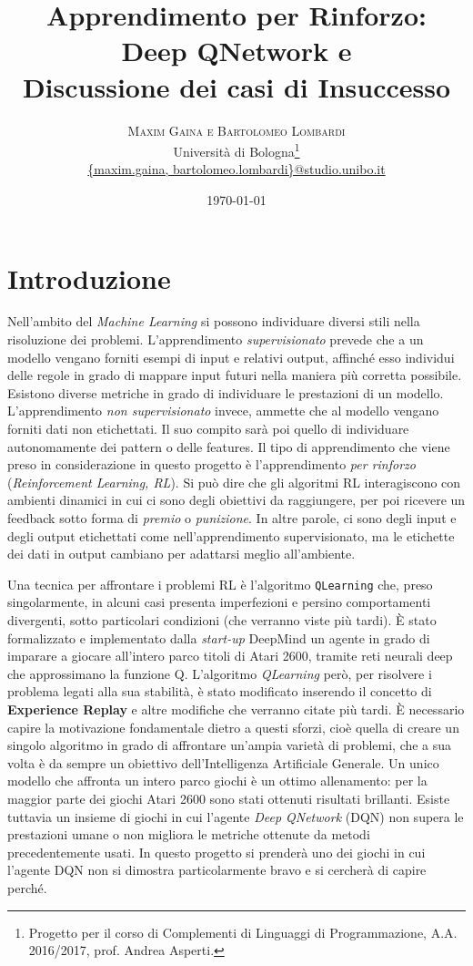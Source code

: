 \documentclass[twoside,twocolumn,10pt]{extarticle}
\title{Apprendimento per Rinforzo:\\Deep Q\texttwelveudash Network e\\ Discussione dei casi di Insuccesso} %
\author{%
\textsc{Maxim Gaina e Bartolomeo Lombardi} \\[1ex] %
\normalsize Università di Bologna\thanks{Progetto per il corso di Complementi di Linguaggi di Programmazione, A.A. 2016/2017, prof. Andrea Asperti.} \\ %
\normalsize \href{mailto:maxim.gaina@studio.unibo.it}{\{maxim.gaina, bartolomeo.lombardi\}@studio.unibo.it}
}
\date{\today} %
\theoremstyle{definition}
\begin{document}
\maketitle

\tableofcontents

\section*{Introduzione}
	\lettrine[nindent = 0.4em,lines=3]{N}\space\MakeTextLowercase{e}ll'ambito del \textit{Machine Learning} si possono individuare diversi stili nella risoluzione dei problemi. L'apprendimento \textit{supervisionato} prevede che a un modello vengano forniti esempi di input e relativi output, affinché esso individui delle regole in grado di mappare input futuri nella maniera più corretta possibile. Esistono diverse metriche in grado di individuare le prestazioni di un modello. L'apprendimento \textit{non supervisionato} invece, ammette che al modello vengano forniti dati non etichettati. Il suo compito sarà poi quello di individuare autonomamente dei pattern o delle features. Il tipo di apprendimento che viene preso in considerazione in questo progetto è l'apprendimento \textit{per rinforzo} (\textit{Reinforcement Learning, RL}). Si può dire che gli algoritmi RL interagiscono con ambienti dinamici in cui ci sono degli obiettivi da raggiungere, per poi ricevere un feedback sotto forma di \textit{premio} o \textit{punizione}. In altre parole, ci sono degli input e degli output etichettati come nell'apprendimento supervisionato, ma le etichette dei dati in output cambiano per adattarsi meglio all'ambiente.
	
	Una tecnica per affrontare i problemi RL è l'algoritmo \texttt{Q\texttwelveudash Learning} che, preso singolarmente, in alcuni casi presenta imperfezioni e persino comportamenti divergenti, sotto particolari condizioni (che verranno viste più tardi). È stato formalizzato e implementato dalla \textit{start-up} DeepMind un agente in grado di imparare a giocare all'intero parco titoli di Atari 2600, tramite reti neurali deep che approssimano la funzione Q. L'algoritmo \textit{Q\texttwelveudash Learning} però, per risolvere i problema legati alla sua stabilità, è stato modificato inserendo il concetto di \textbf{Experience Replay} e altre modifiche che verranno citate più tardi. È necessario capire la motivazione fondamentale dietro a questi sforzi, cioè quella di creare un singolo algoritmo in grado di affrontare un'ampia varietà di problemi, che a sua volta è da sempre un obiettivo dell'Intelligenza Artificiale Generale. Un unico modello che affronta un intero parco giochi è un ottimo allenamento: per la maggior parte dei giochi Atari 2600 sono stati ottenuti risultati brillanti. Esiste tuttavia un insieme di giochi in cui l'agente \textit{Deep Q\texttwelveudash Network} (DQN) non supera le prestazioni umane o non migliora le metriche ottenute da metodi precedentemente usati. In questo progetto si prenderà uno dei giochi in cui l'agente DQN non si dimostra particolarmente bravo e si cercherà di capire perché.
	
\end{document}
